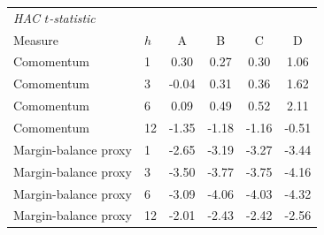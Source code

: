 \begingroup\small\setlength{\tabcolsep}{2.5pt}
\begin{tabular}{llcccc}
\toprule
\multicolumn{6}{l}{\textit{HAC $t$-statistic}} \\
Measure & $h$ & A & B & C & D \\
\midrule
Comomentum & 1 & 0.30 & 0.27 & 0.30 & 1.06 \\
Comomentum & 3 & -0.04 & 0.31 & 0.36 & 1.62 \\
Comomentum & 6 & 0.09 & 0.49 & 0.52 & 2.11 \\
Comomentum & 12 & -1.35 & -1.18 & -1.16 & -0.51 \\
Margin-balance proxy & 1 & -2.65 & -3.19 & -3.27 & -3.44 \\
Margin-balance proxy & 3 & -3.50 & -3.77 & -3.75 & -4.16 \\
Margin-balance proxy & 6 & -3.09 & -4.06 & -4.03 & -4.32 \\
Margin-balance proxy & 12 & -2.01 & -2.43 & -2.42 & -2.56 \\
\bottomrule
\end{tabular}

\endgroup